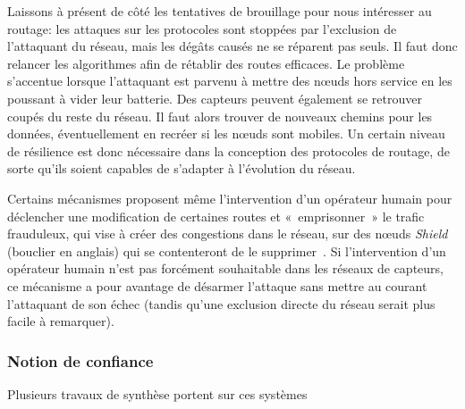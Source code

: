 Laissons à présent de côté les tentatives de brouillage pour nous intéresser au routage: les attaques sur les protocoles sont stoppées par l'exclusion de l'attaquant du réseau, mais les dégâts causés ne se réparent pas seuls.
Il faut donc relancer les algorithmes afin de rétablir des routes efficaces.
Le problème s'accentue lorsque l'attaquant est parvenu à mettre des nœuds hors service en les poussant à vider leur batterie.
Des capteurs peuvent également se retrouver coupés du reste du réseau.
Il faut alors trouver de nouveaux chemins pour les données, éventuellement en recréer si les nœuds sont mobiles.
Un certain niveau de résilience est donc nécessaire dans la conception des protocoles de routage, de sorte qu'ils soient capables de s'adapter à l'évolution du réseau.

Certains mécanismes proposent même l'intervention d'un opérateur humain pour déclencher une modification de certaines routes et « emprisonner » le trafic frauduleux, qui vise à créer des congestions dans le réseau, sur des nœuds \textit{Shield} (bouclier en anglais) qui se contenteront de le supprimer~\cite{HSP13}.
Si l'intervention d'un opérateur humain n'est pas forcément souhaitable dans les réseaux de capteurs, ce mécanisme a pour avantage de désarmer l'attaque sans mettre au courant l'attaquant de son échec (tandis qu'une exclusion directe du réseau serait plus facile à remarquer).

    \subsubsection{Notion de confiance}
Plusieurs travaux de synthèse portent sur ces systèmes~\cite{F-GRL07,MC10}


